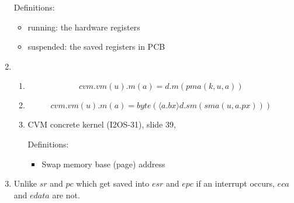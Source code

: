 \documentclass{article}
\begin{document}
\begin{enumerate}
{\begin{enumerate}
{                    Definitions:
                    \begin{itemize}
                        \item running: the hardware registers
                        \item suspended: the saved registers in PCB
                    \end{itemize}
                }
            \end{enumerate}
        }
        \item {
            \begin{enumerate}
                \item {
                    \begin{displaymath}
                        cvm.vm(u).m(a) = d.m(pma(k,u,a))
                    \end{displaymath}
                }
                \item {
                    \begin{displaymath}
                        cvm.vm(u).m(a) = byte(\langle a.bx\rangle d.sm(sma(u,a.px)))
                    \end{displaymath}
                }
                \item {
                    CVM concrete kernel (I2OS-31), slide 39, 
                    
                    Definitions:
                    \begin{itemize}
                        \item Swap memory base (page) address
                    \end{itemize}
                }
            \end{enumerate}
        }
        \item {
            Unlike $sr$ and $pc$ which get saved into $esr$ and $epc$ if an interrupt occurs, $eca$ and $edata$ are not.
        }
    \end{enumerate}
\end{document}
